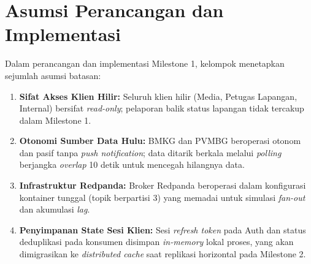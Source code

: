 \section{Asumsi Perancangan dan Implementasi}
Dalam perancangan dan implementasi Milestone 1, kelompok menetapkan sejumlah asumsi batasan:
\begin{enumerate}
    \item \textbf{Sifat Akses Klien Hilir:} Seluruh klien hilir (Media, Petugas Lapangan, Internal) bersifat \textit{read-only}; pelaporan balik status lapangan tidak tercakup dalam Milestone 1.
    \item \textbf{Otonomi Sumber Data Hulu:} BMKG dan PVMBG beroperasi otonom dan pasif tanpa \textit{push notification}; data ditarik berkala melalui \textit{polling} berjangka \textit{overlap} 10 detik untuk mencegah hilangnya data.
    \item \textbf{Infrastruktur Redpanda:} Broker Redpanda beroperasi dalam konfigurasi kontainer tunggal (topik berpartisi 3) yang memadai untuk simulasi \textit{fan-out} dan akumulasi \textit{lag}.
    \item \textbf{Penyimpanan State Sesi Klien:} Sesi \textit{refresh token} pada Auth dan status deduplikasi pada konsumen disimpan \textit{in-memory} lokal proses, yang akan dimigrasikan ke \textit{distributed cache} saat replikasi horizontal pada Milestone 2.
\end{enumerate}
